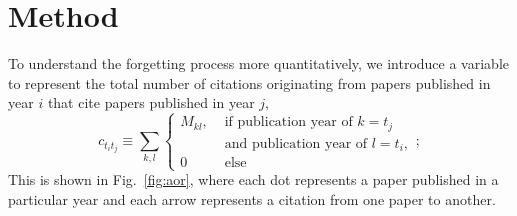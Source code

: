 \documentclass[fleqn,10pt]{wlscirep}
\begin{document}
\section*{Method}

To understand the forgetting process more quantitatively, we introduce a variable to represent the total number of citations originating from papers published in year $i$ that cite papers published in year $j$,
\begin{equation}
c_{t_i t_j} \equiv \sum_{k,l} 
\begin{cases}
M_{kl}, & \text{ if publication year of $k$} = t_j \\
& \text{ and publication year of $l$} = t_i,\\
0 & \text{ else}
\end{cases};
\end{equation}
This is shown in Fig.~\ref{fig:aor}, where each dot represents a paper published in a particular year and each arrow represents a citation from one paper to another.
\end{document}

